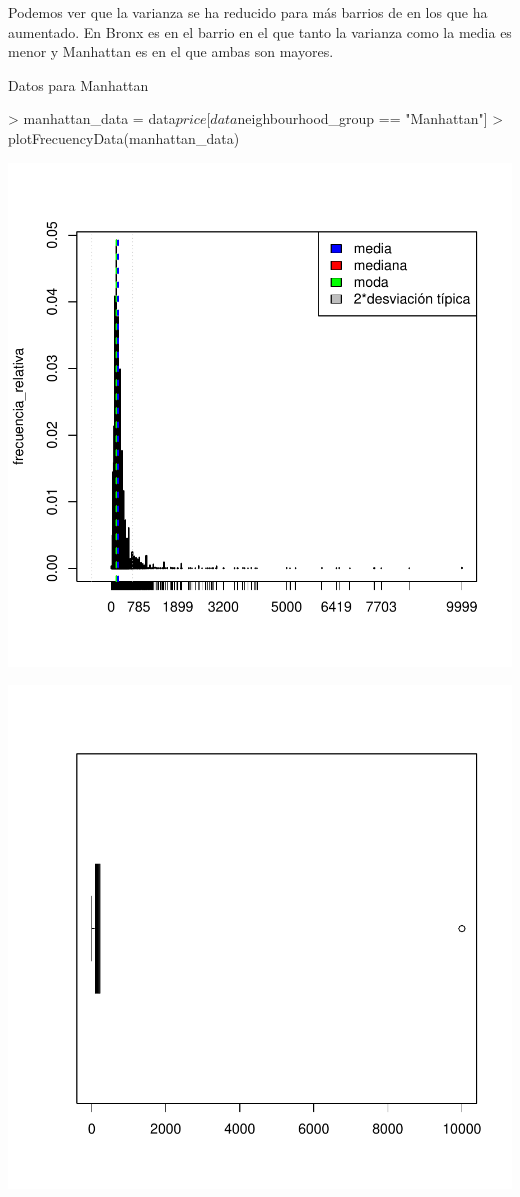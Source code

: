 \documentclass [a4paper] {article}
\begin{document}
Podemos ver que la varianza se ha reducido para más barrios de en los que ha aumentado.
En Bronx es en el barrio en el que tanto la varianza como la media es menor y 
Manhattan es en el que ambas son mayores.

Datos para Manhattan
\begin{center}
\begin{Schunk}
\begin{Sinput}
> manhattan_data = data$price[data$neighbourhood_group == "Manhattan"]
> plotFrecuencyData(manhattan_data)
\end{Sinput}
\end{Schunk}
\includegraphics{entrega-035}
\end{center}
\begin{center}
\includegraphics{entrega-036}
\end{center}
\end{document}
